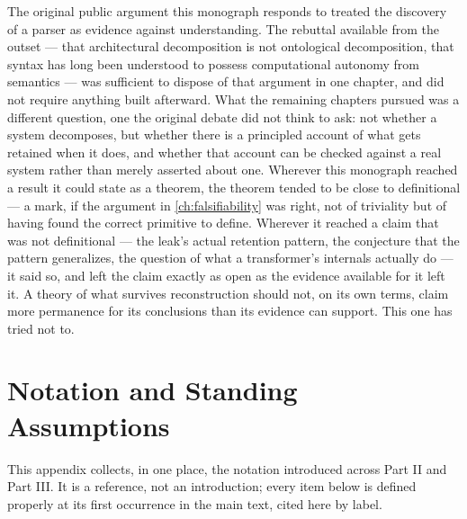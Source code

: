 \documentclass[11pt]{book}
\theoremstyle{plain}
\theoremstyle{definition}
\theoremstyle{remark}
\begin{document}
The original public argument this monograph responds to treated the
discovery of a parser as evidence against understanding. The rebuttal
available from the outset --- that architectural decomposition is not
ontological decomposition, that syntax has long been understood to
possess computational autonomy from semantics --- was sufficient to
dispose of that argument in one chapter, and did not require anything
built afterward. What the remaining chapters pursued was a different
question, one the original debate did not think to ask: not whether a
system decomposes, but whether there is a principled account of what
gets retained when it does, and whether that account can be checked
against a real system rather than merely asserted about one.
Wherever this monograph reached a result it could state as a theorem,
the theorem tended to be close to definitional --- a mark, if the
argument in \cref{ch:falsifiability} was right, not of triviality but
of having found the correct primitive to define. Wherever it reached a
claim that was not definitional --- the leak's actual retention
pattern, the conjecture that the pattern generalizes, the question of
what a transformer's internals actually do --- it said so, and left
the claim exactly as open as the evidence available for it left it. A
theory of what survives reconstruction should not, on its own terms,
claim more permanence for its conclusions than its evidence can
support. This one has tried not to.

\appendix
\chapter{Notation and Standing Assumptions}
\label{app:notation}

This appendix collects, in one place, the notation introduced across
Part II and Part III. It is a reference, not an introduction; every
item below is defined properly at its first occurrence in the main
text, cited here by label.
\end{document}
